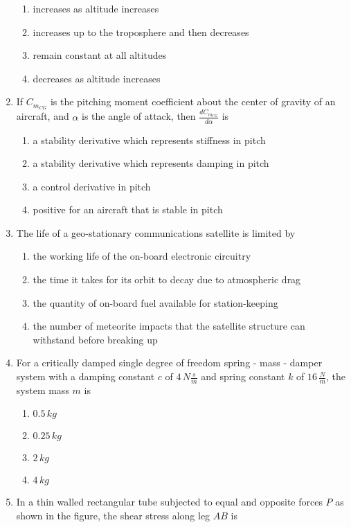 \documentclass[journal]{IEEEtran}
\begin{document}
\begin{enumerate}
\begin{enumerate}
        \item increases as altitude increases
        \item increases up to the troposphere and then decreases
        \item remain constant at all altitudes
        \item decreases as altitude increases
    \end{enumerate}
    \item If $C_{m_{CG}}$ is the pitching moment coefficient about the center of gravity of an aircraft, and $\alpha$ is the angle of attack, then $\frac{dC_{m_{CG}}}{d\alpha}$ is
    \begin{enumerate}
        \item a stability derivative which represents stiffness in pitch
        \item a stability derivative which represents damping in pitch
        \item a control derivative in pitch
        \item positive for an aircraft that is stable in pitch
    \end{enumerate}
    \item The life of a geo-stationary communications satellite is limited by
    \begin{enumerate}
        \item the working life of the on-board electronic circuitry
        \item the time it takes for its orbit to decay due to atmospheric drag
        \item the quantity of on-board fuel available for station-keeping
        \item the number of meteorite impacts that the satellite structure can withstand before breaking up
    \end{enumerate}
    \item For a critically damped single degree of freedom spring - mass - damper system with a damping constant $c$ of $4\,N\frac{s}{m}$ and spring constant $k$ of $16\,\frac{N}{m}$, the system mass $m$ is
    \begin{enumerate}
        \item $0.5\,kg$
        \item $0.25\,kg$
        \item $2\,kg$
        \item $4\,kg$
    \end{enumerate}
    \item In a thin walled rectangular tube subjected to equal and opposite forces $P$ as shown in the figure, the shear stress along leg $AB$ is


\end{enumerate}
\end{document}
